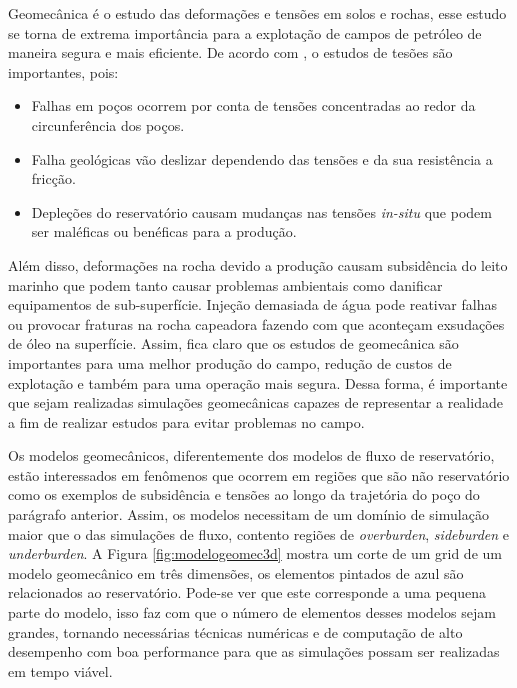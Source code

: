

Geomecânica é o estudo das deformações e tensões em solos e rochas, esse estudo se torna de extrema importância para a explotação de campos de petróleo de maneira segura e mais eficiente. De acordo com \citet{ResGeomec}, o estudos de tesões são importantes, pois:

\begin{itemize}
    \item Falhas em poços ocorrem por conta de tensões concentradas ao redor da circunferência dos poços.
    \item Falha geológicas vão deslizar dependendo das tensões e da sua resistência a fricção. 
    \item Depleções do reservatório causam mudanças nas tensões \textit{in-situ} que podem ser maléficas ou benéficas para a produção.
\end{itemize}

Além disso, deformações na rocha devido a produção causam subsidência do leito marinho que podem tanto causar problemas ambientais como danificar equipamentos de sub-superfície. Injeção demasiada de água  pode reativar falhas ou provocar fraturas na rocha capeadora fazendo com que aconteçam exsudações de óleo na superfície. Assim, fica claro que os estudos de geomecânica são importantes para uma melhor produção do campo, redução de custos de explotação e também para uma operação mais segura. Dessa forma, é importante que sejam realizadas simulações geomecânicas  capazes de representar a realidade a fim de realizar estudos para evitar problemas no campo.

Os modelos geomecânicos, diferentemente dos modelos de fluxo de reservatório, estão interessados em fenômenos que ocorrem em regiões que são não reservatório como os exemplos de subsidência e tensões ao longo da trajetória do poço do parágrafo anterior. Assim, os modelos necessitam de um domínio de simulação maior que o das simulações de fluxo, contento regiões de \textit{overburden}, \textit{sideburden} e \textit{underburden}. A Figura \ref{fig:modelogeomec3d} mostra um corte de um grid de um modelo geomecânico em três dimensões, os elementos pintados de azul são relacionados ao reservatório. Pode-se ver que este corresponde a uma pequena parte do modelo, isso faz com que o número de elementos desses modelos sejam grandes, tornando necessárias técnicas numéricas e de computação de alto desempenho com boa performance para que as simulações possam ser realizadas em tempo viável. 


